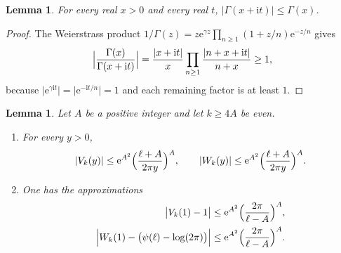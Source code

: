 \documentclass[11pt]{amsart}
\newtheorem{lemma}[theorem]{Lemma}
\theoremstyle{definition}
\theoremstyle{remark}
\numberwithin{equation}{section}
\newcommand{\ee}{\mathrm{e}}
\newcommand{\ii}{\mathrm{i}}
\begin{document}
\begin{lemma}\label{lem:gamma-bound}
For every real $x>0$ and every real $t$, $\lvert\Gamma(x+\ii t)\rvert\le\Gamma(x)$.
\end{lemma}

\begin{proof}
The Weierstrass product $1/\Gamma(z)=z\ee^{\gamma z}\prod_{n\ge 1}(1+z/n)\ee^{-z/n}$ gives
\[
\Bigl\lvert\frac{\Gamma(x)}{\Gamma(x+\ii t)}\Bigr\rvert
=\frac{\lvert x+\ii t\rvert}{x}\prod_{n\ge 1}\frac{\lvert n+x+\ii t\rvert}{n+x}\ge 1,
\]
because $\lvert\ee^{\gamma\ii t}\rvert=\lvert\ee^{-\ii t/n}\rvert=1$ and each remaining factor is at least $1$.
\end{proof}

\begin{lemma}\label{lem:weight-bounds}
Let $A$ be a positive integer and let $k\ge 4A$ be even.
\begin{enumerate}[label=\rm(\roman*)]
\item For every $y>0$,
\begin{equation}\label{eq:V-decay}
\lvert V_k(y)\rvert
\le\ee^{A^2}\Bigl(\frac{\ell+A}{2\pi y}\Bigr)^A,
\qquad
\lvert W_k(y)\rvert
\le\ee^{A^2}\Bigl(\frac{\ell+A}{2\pi y}\Bigr)^A.
\end{equation}
\item One has the approximations
\begin{align}
\bigl\lvert V_k(1)-1\bigr\rvert
&\le\ee^{A^2}\Bigl(\frac{2\pi}{\ell-A}\Bigr)^A,\label{eq:V-one}\\
\Bigl\lvert W_k(1)-\bigl(\psi(\ell)-\log(2\pi)\bigr)\Bigr\rvert
&\le\ee^{A^2}\Bigl(\frac{2\pi}{\ell-A}\Bigr)^A.\label{eq:W-one}
\end{align}
\end{enumerate}
\end{lemma}
\end{document}
